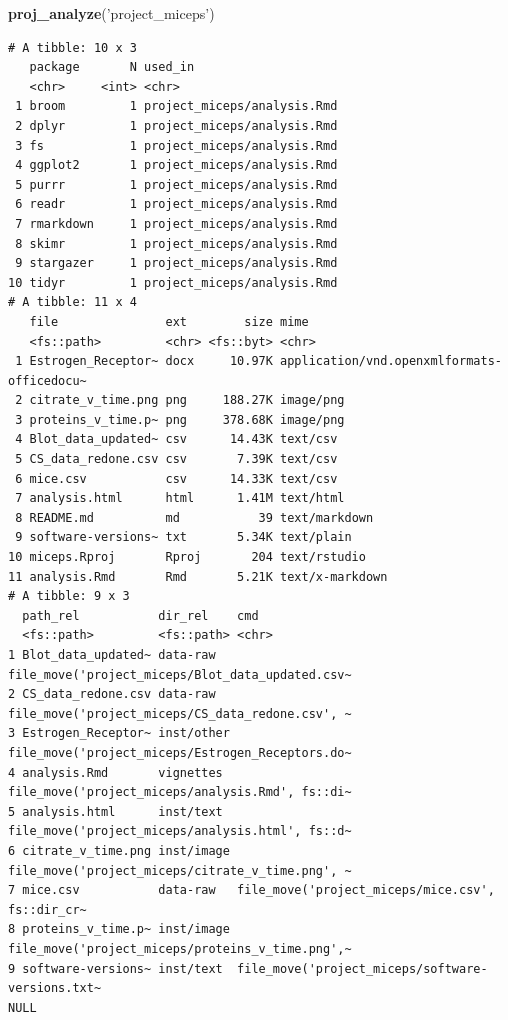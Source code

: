 \documentclass[12pt,twoside]{reedthesis}
\newenvironment{Shaded}{\begin{snugshade}}{\end{snugshade}}
\newcommand{\KeywordTok}[1]{\textcolor[rgb]{0.13,0.29,0.53}{\textbf{#1}}}
\newcommand{\NormalTok}[1]{#1}
\newcommand{\StringTok}[1]{\textcolor[rgb]{0.31,0.60,0.02}{#1}}
\begin{document}
\begin{Shaded}
\begin{Highlighting}[]
\KeywordTok{proj_analyze}\NormalTok{(}\StringTok{'project_miceps'}\NormalTok{)}
\end{Highlighting}
\end{Shaded}
\footnotesize
\begin{verbatim}
# A tibble: 10 x 3
   package       N used_in                    
   <chr>     <int> <chr>                      
 1 broom         1 project_miceps/analysis.Rmd
 2 dplyr         1 project_miceps/analysis.Rmd
 3 fs            1 project_miceps/analysis.Rmd
 4 ggplot2       1 project_miceps/analysis.Rmd
 5 purrr         1 project_miceps/analysis.Rmd
 6 readr         1 project_miceps/analysis.Rmd
 7 rmarkdown     1 project_miceps/analysis.Rmd
 8 skimr         1 project_miceps/analysis.Rmd
 9 stargazer     1 project_miceps/analysis.Rmd
10 tidyr         1 project_miceps/analysis.Rmd
# A tibble: 11 x 4
   file               ext        size mime                                      
   <fs::path>         <chr> <fs::byt> <chr>                                     
 1 Estrogen_Receptor~ docx     10.97K application/vnd.openxmlformats-officedocu~
 2 citrate_v_time.png png     188.27K image/png                                 
 3 proteins_v_time.p~ png     378.68K image/png                                 
 4 Blot_data_updated~ csv      14.43K text/csv                                  
 5 CS_data_redone.csv csv       7.39K text/csv                                  
 6 mice.csv           csv      14.33K text/csv                                  
 7 analysis.html      html      1.41M text/html                                 
 8 README.md          md           39 text/markdown                             
 9 software-versions~ txt       5.34K text/plain                                
10 miceps.Rproj       Rproj       204 text/rstudio                              
11 analysis.Rmd       Rmd       5.21K text/x-markdown                           
# A tibble: 9 x 3
  path_rel           dir_rel    cmd                                             
  <fs::path>         <fs::path> <chr>                                           
1 Blot_data_updated~ data-raw   file_move('project_miceps/Blot_data_updated.csv~
2 CS_data_redone.csv data-raw   file_move('project_miceps/CS_data_redone.csv', ~
3 Estrogen_Receptor~ inst/other file_move('project_miceps/Estrogen_Receptors.do~
4 analysis.Rmd       vignettes  file_move('project_miceps/analysis.Rmd', fs::di~
5 analysis.html      inst/text  file_move('project_miceps/analysis.html', fs::d~
6 citrate_v_time.png inst/image file_move('project_miceps/citrate_v_time.png', ~
7 mice.csv           data-raw   file_move('project_miceps/mice.csv', fs::dir_cr~
8 proteins_v_time.p~ inst/image file_move('project_miceps/proteins_v_time.png',~
9 software-versions~ inst/text  file_move('project_miceps/software-versions.txt~
NULL
\end{verbatim}
\normalsize
\end{document}
